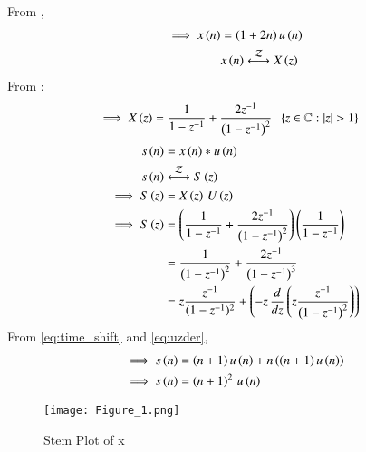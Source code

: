 \documentclass[journal,12pt,twocolumn]{IEEEtran}
\theoremstyle{remark}
\begin{document}
From ,
\begin{align}
    \implies x\brak{n}&= \brak{1+2n}u\brak{n}\\
    &x\brak{n}\system{Z}X\brak{z}\notag\\
\end{align}
    From :
\begin{align}
    \implies X\brak{z}&=\frac{1}{1-z^{-1}}+\frac{2z^{-1}}{\brak{1-z^{-1}}^2}\;\;\cbrak{z\in\mathbb{C}: |z|>1}
\end{align}
\begin{align}
   s\brak{n}&=x\brak{n}*u\brak{n}\\
   s\brak{n}&\system{Z}S\brak{z}\notag\\
   \implies S\brak{z}&=X\brak{z}\,U\brak{z}\\
   \implies S\brak{z}&=\brak{\frac{1}{1-z^{-1}}+\frac{2z^{-1}}{\brak{1-z^{-1}}^2}}\brak{\frac{1}{1-z^{-1}}}\\
   &=\frac{1}{\brak{1-z^{-1}}^2}+\frac{2z^{-1}}{\brak{1-z^{-1}}^3}\\
   &=z\frac{z^{-1}}{({1-z^{-1}})^2}+\brak{-z\,\frac{d}{dz}\brak{z\frac{z^{-1}}{\brak{1-z^{-1}}^2}}}
\end{align}
   From \eqref{eq:time_shift} and \eqref{eq:uzder},
   \begin{align}
   \implies s\left(n\right)&=\left(n+1\right)u\left(n\right)+n\left(\left(n+1\right)u\left(n\right)\right)\\
   \implies s\left(n\right)&=\left(n+1\right)^2\,u\left(n\right)
\end{align}
\begin{figure}[h!]
   \centering
   \texttt{[image: Figure\_1.png]}
   \caption{Stem Plot of x}
   \label{stemplot}
\end{figure}
\end{document}
